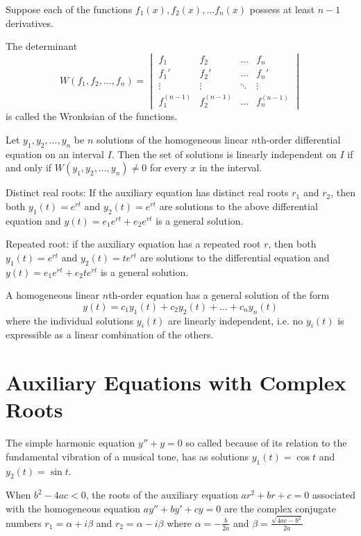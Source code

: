 \documentclass[../diffeq.tex]{subfiles}
\begin{document}
\begin{definition}[Wronksian]
    Suppose each of the functions $f_1(x),f_2(x),\dots f_n(x)$ possess at least $n-1$ derivatives. 
    
    The determinant \[
        W(f_1, f_2, \dots, f_n) =
        \begin{vmatrix}
        f_1 & f_2 & \dots & f_n \\
        f_1' & f_2' & \dots & f_n' \\
        \vdots & \vdots & \ddots & \vdots \\
        f_1^{(n-1)} & f_2^{(n-1)} & \dots & f_n^{(n-1)}
        \end{vmatrix}
        \]
        is called the Wronksian of the functions.
\end{definition}

\begin{theorem}
    Let $y_1,y_2,\dots,y_n$ be $n$ solutions of the homogeneous linear $n$th-order differential equation on an interval $I$. Then the set of solutions is linearly independent on $I$ 
    if and only if $W(y_1,y_2,\dots,y_n)\neq 0$ for every $x$ in the interval.
\end{theorem}

Distinct real roots: If the auxiliary equation has distinct real roots $r_1$ and $r_2$, then both $y_1(t)=e^{rt}$ and $y_2(t)=e^{rt}$ are solutions to the above differential equation and $y(t)=e_1e^{rt}+e_2e^{rt}$ is a general solution.

Repeated root: if the auxiliary equation has a repeated root $r$, then both $y_1(t)=e^{rt}$ and $y_2(t)=te^{rt}$ are solutions to the differential equation and $y(t)=e_1e^{rt}+e_2te^{rt}$ is a general solution.

A homogeneous linear $n$th-order equation has a general solution of the form 
\[ y(t)=c_1y_1(t)+c_2y_2(t)+\dots+c_ny_n(t) \]
where the individual solutions $y_i(t)$ are linearly independent, i.e. no $y_i(t)$ is expressible as a linear combination of the others.

\section{Auxiliary Equations with Complex Roots}
The simple harmonic equation $y''+y=0$ so called because of its relation to the fundamental vibration of a musical tone, has as solutions $y_1(t)=\cos t$ and $y_2(t)=\sin t$.

When $b^2-4ac<0$, the roots of the auxiliary equation $ar^2+br+c=0$ associated with the homogeneous equation $ay''+by'+cy=0$ are the complex conjugate numbers $r_1=\alpha + i\beta$ and $r_2=\alpha-i\beta$ where $\alpha=-\frac{b}{2a}$ and $\beta = \frac{\sqrt{4ac-b^2}}{2a}$
\end{document}
